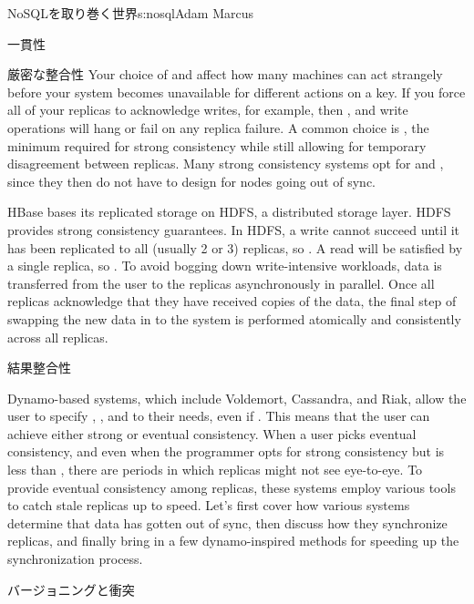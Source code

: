 \begin{aosachapter}{NoSQLを取り巻く世界}{s:nosql}{Adam Marcus}
\begin{aosasect1}{一貫性}
\begin{aosasect2}{厳密な整合性}
Your choice of  and  affect how many machines can act
strangely before your system becomes unavailable for different actions
on a key.  If you force all of your replicas to acknowledge writes,
for example, then , and write operations will hang or fail
on any replica failure.  A common choice is ,
the minimum required for strong consistency while still allowing for
temporary disagreement between replicas.  Many strong consistency
systems opt for  and , since they then do not have
to design for nodes going out of sync.

HBase bases its replicated storage on HDFS, a distributed storage layer.  HDFS provides strong consistency
guarantees.  In HDFS, a write cannot succeed until it has been
replicated to all  (usually 2 or 3) replicas, so .
A read will be satisfied by a single replica, so .  To
avoid bogging down write-intensive workloads, data is transferred from
the user to the replicas asynchronously in parallel.  Once all
replicas acknowledge that they have received copies of the data, the
final step of swapping the new data in to the system is performed
atomically and consistently across all replicas.

\end{aosasect2}

\begin{aosasect2}{結果整合性}

Dynamo-based systems, which include Voldemort, Cassandra, and Riak,
allow the user to specify , , and  to their
needs, even if .  This means that the user
can achieve either strong or eventual consistency.  When a user picks
eventual consistency, and even when the programmer opts for strong
consistency but  is less than , there are periods in
which replicas might not see eye-to-eye.  To provide eventual
consistency among replicas, these systems employ various tools to
catch stale replicas up to speed.  Let's first cover how various
systems determine that data has gotten out of sync, then discuss how
they synchronize replicas, and finally bring in a few dynamo-inspired
methods for speeding up the synchronization process.

\begin{aosasect3}{バージョニングと衝突}


\end{aosasect3}
\end{aosasect2}
\end{aosasect1}
\end{aosachapter}
